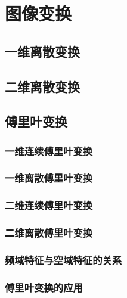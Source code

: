 \documentclass[cn, blue, normal, 12pt]{elegantnote}
\begin{document}
{\section{图像变换}

\subsection{一维离散变换}



\subsection{二维离散变换}



\subsection{傅里叶变换}

\subsubsection{一维连续傅里叶变换}



\subsubsection{一维离散傅里叶变换}



\subsubsection{二维连续傅里叶变换}



\subsubsection{二维离散傅里叶变换}



\subsubsection{频域特征与空域特征的关系}



\subsubsection{傅里叶变换的应用}



}
\end{document}
